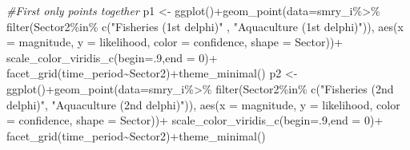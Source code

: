 \documentclass[
]{article}
\newenvironment{Shaded}{\begin{snugshade}}{\end{snugshade}}
\newcommand{\AttributeTok}[1]{\textcolor[rgb]{0.77,0.63,0.00}{#1}}
\newcommand{\CommentTok}[1]{\textcolor[rgb]{0.56,0.35,0.01}{\textit{#1}}}
\newcommand{\DecValTok}[1]{\textcolor[rgb]{0.00,0.00,0.81}{#1}}
\newcommand{\FunctionTok}[1]{\textcolor[rgb]{0.00,0.00,0.00}{#1}}
\newcommand{\NormalTok}[1]{#1}
\newcommand{\OtherTok}[1]{\textcolor[rgb]{0.56,0.35,0.01}{#1}}
\newcommand{\SpecialCharTok}[1]{\textcolor[rgb]{0.00,0.00,0.00}{#1}}
\newcommand{\StringTok}[1]{\textcolor[rgb]{0.31,0.60,0.02}{#1}}
\begin{document}
\begin{Shaded}
\begin{Highlighting}[]
    
     \CommentTok{\#First only points together}
\NormalTok{   p1 }\OtherTok{\textless{}{-}}  \FunctionTok{ggplot}\NormalTok{()}\SpecialCharTok{+}\FunctionTok{geom\_point}\NormalTok{(}\AttributeTok{data=}\NormalTok{smry\_i}\SpecialCharTok{\%\textgreater{}\%}
                               \FunctionTok{filter}\NormalTok{(Sector2}\SpecialCharTok{\%in\%}
                                        \FunctionTok{c}\NormalTok{(}\StringTok{"Fisheries (1st delphi)"}\NormalTok{ , }
                                          \StringTok{"Aquaculture (1st delphi)"}\NormalTok{)),}
                             \FunctionTok{aes}\NormalTok{(}\AttributeTok{x     =}\NormalTok{ magnitude,}
                                             \AttributeTok{y     =}\NormalTok{ likelihood,}
                                             \AttributeTok{color =}\NormalTok{ confidence,}
                                             \AttributeTok{shape =}\NormalTok{ Sector))}\SpecialCharTok{+}
      \FunctionTok{scale\_color\_viridis\_c}\NormalTok{(}\AttributeTok{begin=}\NormalTok{.}\DecValTok{9}\NormalTok{,}\AttributeTok{end =} \DecValTok{0}\NormalTok{)}\SpecialCharTok{+}
      \FunctionTok{facet\_grid}\NormalTok{(time\_period}\SpecialCharTok{\textasciitilde{}}\NormalTok{Sector2)}\SpecialCharTok{+}\FunctionTok{theme\_minimal}\NormalTok{()}
\NormalTok{   p2 }\OtherTok{\textless{}{-}}  \FunctionTok{ggplot}\NormalTok{()}\SpecialCharTok{+}\FunctionTok{geom\_point}\NormalTok{(}\AttributeTok{data=}\NormalTok{smry\_i}\SpecialCharTok{\%\textgreater{}\%}
                               \FunctionTok{filter}\NormalTok{(Sector2}\SpecialCharTok{\%in\%}
                                        \FunctionTok{c}\NormalTok{(}\StringTok{"Fisheries (2nd delphi)"}\NormalTok{,}
                                          \StringTok{"Aquaculture (2nd delphi)"}\NormalTok{)),}
                             \FunctionTok{aes}\NormalTok{(}\AttributeTok{x     =}\NormalTok{ magnitude,}
                                             \AttributeTok{y     =}\NormalTok{ likelihood,}
                                             \AttributeTok{color =}\NormalTok{ confidence,}
                                             \AttributeTok{shape =}\NormalTok{ Sector))}\SpecialCharTok{+}
      \FunctionTok{scale\_color\_viridis\_c}\NormalTok{(}\AttributeTok{begin=}\NormalTok{.}\DecValTok{9}\NormalTok{,}\AttributeTok{end =} \DecValTok{0}\NormalTok{)}\SpecialCharTok{+}
      \FunctionTok{facet\_grid}\NormalTok{(time\_period}\SpecialCharTok{\textasciitilde{}}\NormalTok{Sector2)}\SpecialCharTok{+}\FunctionTok{theme\_minimal}\NormalTok{()}
     

\end{Highlighting}
\end{Shaded}
\end{document}
